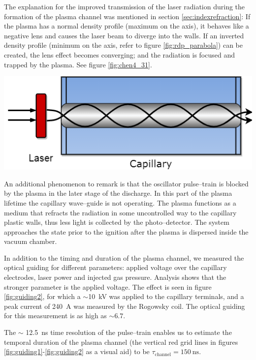 \documentclass[../main.tex]{subfiles}
\begin{document}
The explanation for the improved transmission of the laser radiation during the formation of the plasma channel was mentioned in section \ref{sec:indexrefraction}: If the plasma has a normal density profile (maximum on the axis), it behaves like a negative lens and causes the laser beam to diverge into the walls. If an inverted density profile (minimum on the axis, refer to figure \ref{fig:rdp_parabola}) can be created, the lens effect becomes converging; and the radiation is focused and trapped by the plasma. See figure \ref{fig:chen4_31}.
\begin{marginfigure}
\includegraphics[width=\marginparwidth]{figures/chen4_31.png}
\caption{Plasma confined inside the capillary will trap the \SI{800}{\nm} laser light only if the plasma has a density minimum on axis.}
\label{fig:chen4_31}
\end{marginfigure}

An additional phenomenon to remark is that the oscillator pulse--train is blocked by the plasma in the later stage of the discharge. In this part of the plasma lifetime the capillary wave--guide is not operating. The plasma functions as a medium that refracts the radiation in some uncontrolled way to the capillary plastic walls, thus less light is collected by the photo--detector. The system approaches the state prior to the ignition after the plasma is dispersed inside the vacuum chamber.

In addition to the timing and duration of the plasma channel, we measured the optical guiding for different parameters: applied voltage over the capillary electrodes, laser power and injected gas pressure. Analysis shows that the stronger parameter is the applied voltage. The effect is seen in figure \ref{fig:guiding2}, for which a $\sim$\SI{10}{\kilo\volt} was applied to the capillary terminals, and a peak current of \SI{240}{\A} was measured by the Rogowsky coil. The optical guiding for this measurement is as high as $\sim 6.7$.

The $\sim$ \SI{12.5}{\ns} time resolution of the pulse--train enables us to estimate the temporal duration of the plasma channel (the vertical red grid lines in figures \ref{fig:guiding1}-\ref{fig:guiding2} as a visual aid) to be $\tau_\text{channel}=\SI{150}{\ns}$.
\end{document}
